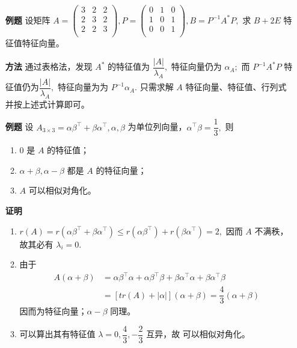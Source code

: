\begin{itemize}
    \item[\textbf{例题}] 设矩阵 $ A = \begin{pmatrix}
        3&2&2\\2&3&2\\2&2&3\\
    \end{pmatrix}, P = \begin{pmatrix}
        0&1&0\\1&0&1\\0&0&1\\
    \end{pmatrix}, B = P^{-1}A^*P,$ 求 $ B + 2E $ 特征值特征向量。
    \item[\textbf{方法}] 通过表格法，发现 $ A^* $ 的特征值为 $ \dfrac{|A|}{\lambda_A}, $ 
    特征向量仍为 $ \alpha_A; $ 而 $ P^{-1}A^*P $ 特征值仍为$ \dfrac{|A|}{\lambda_A}, $ 
    特征向量为为 $ P^{-1}\alpha_A. $
    只需求解 $ A $ 特征向量、特征值、行列式并按上述式计算即可。
\end{itemize}

\begin{itemize}
    \item[\textbf{例题}] 
    设 $ A_{3\times 3} = \alpha\beta^\top + \beta\alpha^\top,
    \alpha,\beta $ 为单位列向量，$ \alpha^\top\beta = \dfrac{1}{3}, $ 则
    \begin{enumerate}[label = \Roman*.]
        \item $ 0 $ 是 $ A $ 的特征值；
        \item $ \alpha+\beta,\alpha-\beta $ 都是 $ A $ 的特征向量；
        \item $ A $ 可以相似对角化。
    \end{enumerate}
    \item[\textbf{证明}]
    \begin{enumerate}[label = \Roman*.]
        \item $ r(A) = r(\alpha\beta^\top+\beta\alpha^\top)
        \leq r(\alpha\beta^\top) + r(\beta\alpha^\top) = 2, $ 
        因而 $ A $ 不满秩，故其必有 $ \lambda_i = 0. $ 
        \item 由于
        \begin{equation*}
            \begin{aligned}
                A(\alpha+\beta) &= \alpha\beta^\top\alpha + \alpha\beta^\top\beta
                + \beta\alpha^\top\alpha + \beta\alpha^\top\beta 
                \\&= [tr(A) + |\alpha|](\alpha+\beta) = \dfrac{4}{3}(\alpha+\beta)
            \end{aligned}
        \end{equation*}
        因而为特征向量；$ \alpha-\beta $ 同理。
        \item 可以算出其有特征值 $ \lambda = 0,\dfrac43,-\dfrac{2}{3} $ 互异，故
        可以相似对角化。
    \end{enumerate}
\end{itemize}


